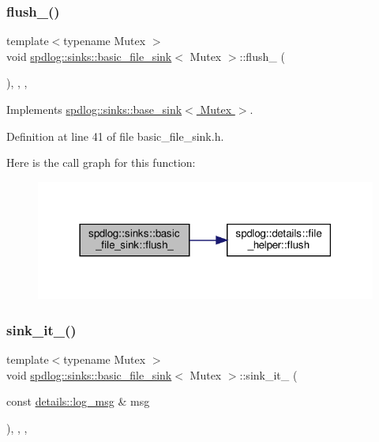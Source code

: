 \subsubsection{\texorpdfstring{flush\+\_\+()}{flush\_()}}
{\footnotesize\ttfamily template$<$typename Mutex $>$ \\
void \hyperlink{classspdlog_1_1sinks_1_1basic__file__sink}{spdlog\+::sinks\+::basic\+\_\+file\+\_\+sink}$<$ Mutex $>$\+::flush\+\_\+ (\begin{DoxyParamCaption}{ }\end{DoxyParamCaption})\hspace{0.3cm}{\ttfamily [inline]}, {\ttfamily [override]}, {\ttfamily [protected]}, {\ttfamily [virtual]}}



Implements \hyperlink{classspdlog_1_1sinks_1_1base__sink_a5ac2b237c60f68a18122a1ca09b812b4}{spdlog\+::sinks\+::base\+\_\+sink$<$ Mutex $>$}.



Definition at line 41 of file basic\+\_\+file\+\_\+sink.\+h.

Here is the call graph for this function\+:
\nopagebreak
\begin{figure}[H]
\begin{center}
\leavevmode
\includegraphics[width=318pt]{classspdlog_1_1sinks_1_1basic__file__sink_a689a12d9459d081edff7f8c7d3af227c_cgraph}
\end{center}
\end{figure}
\mbox{\label{classspdlog_1_1sinks_1_1basic__file__sink_a8d9239f225478ade4e879dc643f577ba}} 
\subsubsection{\texorpdfstring{sink\+\_\+it\+\_\+()}{sink\_it\_()}}
{\footnotesize\ttfamily template$<$typename Mutex $>$ \\
void \hyperlink{classspdlog_1_1sinks_1_1basic__file__sink}{spdlog\+::sinks\+::basic\+\_\+file\+\_\+sink}$<$ Mutex $>$\+::sink\+\_\+it\+\_\+ (\begin{DoxyParamCaption}\item[{const \hyperlink{structspdlog_1_1details_1_1log__msg}{details\+::log\+\_\+msg} \&}]{msg }\end{DoxyParamCaption})\hspace{0.3cm}{\ttfamily [inline]}, {\ttfamily [override]}, {\ttfamily [protected]}, {\ttfamily [virtual]}}



